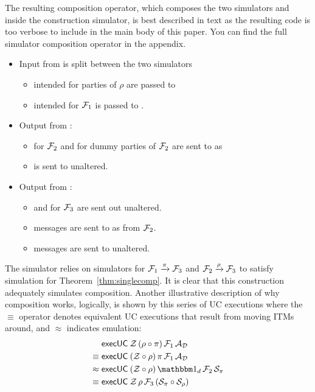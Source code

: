 The resulting composition operator, which composes the two simulators \SIM{\rho} and \SIM{\pi} inside the construction simulator, is best described in text as the resulting code is too verbose to include in the main body of this paper.
You can find the full simulator composition operator in the appendix.
\begin{itemize}
	\item Input from \Z is split between the two simulators
	\begin{itemize} 
		\item {} intended for parties of $\rho$ are passed to \SIM{\rho}
		\item {} intended for $\mathcal{F}_1$ is passed to \SIM{\pi}.
	\end{itemize}
	\item Output from \SIM{\pi}: 
	\begin{itemize}
		\item {} for $\mathcal{F}_2$ and  for dummy parties of $\mathcal{F}_2$ are sent to \SIM{\rho} as 
		\item {} is sent to \Z unaltered.
	\end{itemize}
	\item Output from \SIM{\rho}: 
	\begin{itemize}
		\item {} and  for $\mathcal{F}_3$ are sent out unaltered.
		\item {} messages are sent to \SIM{\pi} as  from $\mathcal{F}_2$.
		\item {} messages are sent to \Z unaltered.
	\end{itemize}
\end{itemize}
The simulator relies on simulators for $\mathcal{F}_1 \xrightarrow{\pi} \mathcal{F}_3$ and $\mathcal{F}_2 \xrightarrow{\rho} \mathcal{F}_3$ to satisfy simulation for Theorem~\ref{thm:singlecomp}.
It is clear that this construction adequately simulates composition.
Another illustrative description of why composition works, logically, is shown by this series of UC executions where the $\equiv$ operator denotes equivalent UC executions that result from moving ITMs around, and $\approx$ indicates emulation:
\begin{align}
& \msf{execUC} \: \Z \, (\rho \circ \pi) \, \F_1 \, \DA \\
\equiv \; & \msf{execUC} \: (\Z \circ \rho) \, \pi \, \F_1 \, \DA \\
\approx \; & \msf{execUC} \: (\Z \circ \rho) \, \idealP \, \F_2 \, \SIM{\pi} \\
\equiv \; & \msf{execUC} \: \Z \, \rho \, \F_3 \, (\SIM{\pi} \circ \SIM{\rho})
\end{align}

